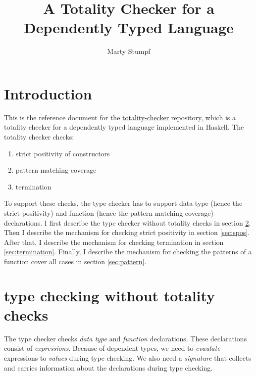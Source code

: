 \documentclass[acmsmall]{acmart}
\begin{document}
\title{A Totality Checker for a Dependently Typed Language}

%
\author{Marty Stumpf}

%

%
%
\maketitle
\thispagestyle{empty}
\tableofcontents
\clearpage
\section{Introduction}

This is the reference document for the
\href{https://github.com/thealmarty/totality-checker}{totality-checker}
repository, which is a totality checker for a dependently typed language
implemented in Haskell. The totality checker checks:

\begin{enumerate}
  \item strict positivity of constructors
  \item pattern matching coverage
  \item termination
\end{enumerate}

To support these checks, the type checker has to support data type (hence the
strict positivity) and function (hence the pattern matching coverage)
declarations. I first describe the type checker without totality checks in
section \ref{sec:prelim}. Then I describe the mechanism for checking strict positivity
in section \ref{sec:spos}. After that, I describe the mechanism for checking
termination in section \ref{sec:termination}. Finally, I describe the mechanism
for checking the patterns of a function cover all cases in section
\ref{sec:pattern}.

\section{type checking without totality checks}
\label{sec:prelim}
The type checker checks \emph{data type} and \emph{function} declarations. These declarations
consist of \emph{expressions}. Because of dependent types, we need to \emph{evaulate} expressions to \emph{values} during type checking. We also need a \emph{signature} that collects and carries information about the declarations during type checking.
\end{document}
